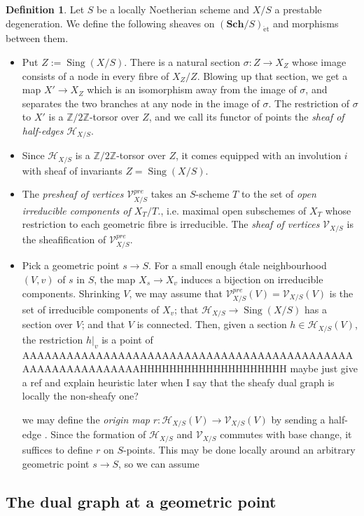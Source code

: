\documentclass[a4paper,12pt]{amsart} %
\numberwithin{equation}{subsection}
\newcommand{\Schet}[1]{(\cat{Sch}/#1)_\et}
\newcommand{\ca}[1]{{\mathcal{#1}}}
\newcommand{\bd}[1]{{\mathbf{#1}}}
\newcommand{\cat}[1]{\bd{#1}}
\def\ZZ{\mathbb Z}
\def\et{\mathrm{\acute{e}t}}
\def\Sing{\operatorname{Sing}}
\theoremstyle{definition}
\newtheorem{definition}{Definition}[section]
\theoremstyle{plain}%
\theoremstyle{remark}
\begin{document}
\begin{definition}
	Let $S$ be a locally Noetherian scheme and $X/S$ a prestable degeneration. We define the following sheaves on $\Schet{S}$ and morphisms between them.
	\begin{itemize}
		\item Put $Z:=\Sing(X/S)$. There is a natural section $\sigma\colon Z \to X_Z$ whose image consists of a node in every fibre of $X_Z/Z$. Blowing up that section, we get a map $X' \to X_Z$ which is an isomorphism away from the image of $\sigma$, and separates the two branches at any node in the image of $\sigma$. The restriction of $\sigma$ to $X'$ is a $\ZZ/2\ZZ$-torsor over $Z$, and we call its functor of points the \emph{sheaf of half-edges} $\ca H_{X/S}$.
		\item Since $\ca H_{X/S}$ is a $\ZZ/2\ZZ$-torsor over $Z$, it comes equipped with an involution $i$ with sheaf of invariants $Z=\Sing(X/S)$.
		\item The \emph{presheaf of vertices} $\ca V^{pre}_{X/S}$ takes an $S$-scheme $T$ to the set of \emph{open irreducible components of $X_T/T$.}, i.e. maximal open subschemes of $X_T$ whose restriction to each geometric fibre is irreducible. The \emph{sheaf of vertices} $\ca V_{X/S}$ is the sheafification of $\ca V^{pre}_{X/S}$.
		\item Pick a geometric point $s \to S$. For a small enough \'etale neighbourhood $(V,v)$ of $s$ in $S$, the map $X_s \to X_v$ induces a bijection on irreducible components. Shrinking $V$, we may assume that $\ca V^{pre}_{X/S}(V)=\ca V_{X/S}(V)$ is the set of irreducible components of $X_v$; that $\ca H_{X/S} \to \Sing(X/S)$ has a section over $V$; and that $V$ is connected. Then, given a section $h\in \ca H_{X/S}(V)$, the restriction $h|_v$ is a point of AAAAAAAAAAAAAAAAAAAAAAAAAAAAAAAAAAAAAAAAAAAAAAAAAAAAAAAAAAAAAHHHHHHHHHHHHHHHHHHHH maybe just give a ref and explain heuristic later when I say that the sheafy dual graph is locally the non-sheafy one?
		
		 we may define the \emph{origin map} $r\colon \ca H_{X/S}(V) \to \ca V_{X/S}(V)$ by sending a half-edge . Since the formation of $\ca H_{X/S}$ and $\ca V_{X/S}$ commutes with base change, it suffices to define $r$ on $S$-points. This may be done locally around an arbitrary geometric point $s \to S$, so we can assume
	\end{itemize}
\end{definition}


\subsection{The dual graph at a geometric point}
\end{document}

